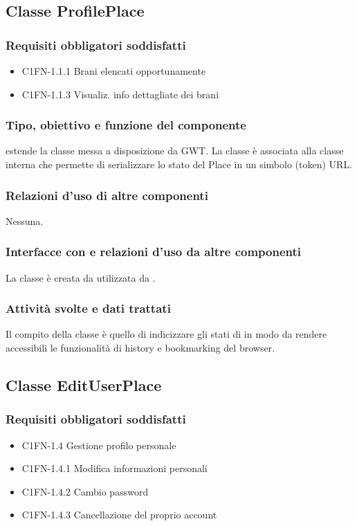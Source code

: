 \subsection{Classe ProfilePlace}
\subsubsection*{Requisiti obbligatori soddisfatti}
\begin{itemize}
	\item C1FN-1.1.1 Brani elencati opportunamente
	\item C1FN-1.1.3 Visualiz. info dettagliate dei brani
\end{itemize}
\subsubsection*{Tipo, obiettivo e funzione del componente}
 estende la classe  messa a disposizione da GWT. La
classe \`e associata alla classe interna  che permette di
serializzare lo stato del Place in un simbolo (token) URL.
\subsubsection*{Relazioni d'uso di altre componenti}
Nessuna.
\subsubsection*{Interfacce con e relazioni d'uso da altre componenti}
La classe \`e creata da  utilizzata da .
\subsubsection*{Attivit\`a svolte e dati trattati}
Il compito della classe \`e quello di indicizzare gli stati di
 in modo da rendere accessibili le funzionalit\`a di history
e bookmarking del browser.

\subsection{Classe EditUserPlace}
\subsubsection*{Requisiti obbligatori soddisfatti}
\begin{itemize}
	\item C1FN-1.4 Gestione profilo personale
	\item C1FN-1.4.1 Modifica informazioni personali
	\item C1FN-1.4.2 Cambio password
	\item C1FN-1.4.3 Cancellazione del proprio account
\end{itemize}
